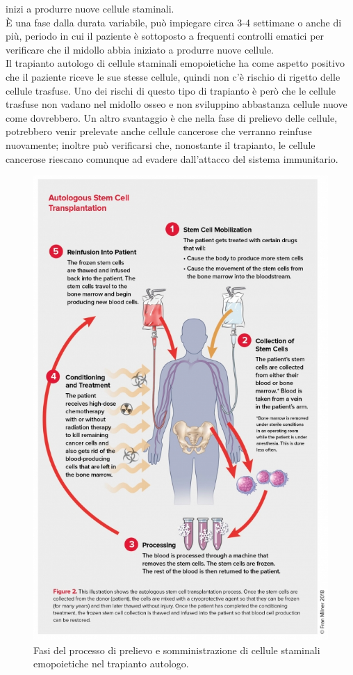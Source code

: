 inizi a produrre nuove cellule staminali\cite{TRAPIANTO}.\\
È una fase dalla durata variabile, può impiegare circa 3-4 settimane o anche di più, periodo in cui il paziente 
è sottoposto a frequenti controlli ematici per verificare che il midollo abbia iniziato a produrre nuove cellule\cite{LLSBLOOD}.\\
Il trapianto autologo di cellule staminali emopoietiche ha come aspetto positivo che il paziente riceve le sue stesse cellule, quindi non c’è rischio di rigetto delle cellule trasfuse. 
Uno dei rischi di questo tipo di trapianto è però che le cellule trasfuse non vadano nel midollo osseo e non 
sviluppino abbastanza cellule nuove come dovrebbero. Un altro svantaggio è che nella fase di prelievo delle cellule, 
potrebbero venir prelevate anche cellule cancerose che verranno reinfuse nuovamente; inoltre  può verificarsi che, 
nonostante il trapianto, le cellule cancerose riescano comunque ad evadere dall’attacco del sistema immunitario\cite{STEMCELLS}.\\

\begin{figure}[H]
    \begin{center}
    \includegraphics[width=0.7\columnwidth]{img/AUTOLOGO.jpeg}
    \end{center}
    \caption{Fasi del processo di prelievo e somministrazione di cellule staminali emopoietiche nel trapianto autologo.
    \cite{LLSBLOOD}}
    \label{fig:FIGURE_3.15}
\end{figure}

